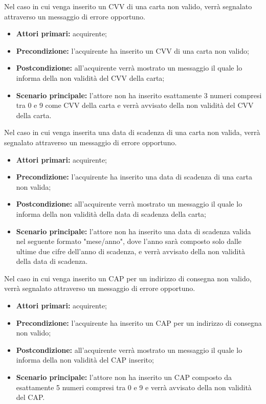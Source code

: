 Nel caso in cui venga inserito un CVV di una carta non valido, verrà segnalato attraverso un messaggio di errore opportuno.
\begin{itemize}
	\item \textbf{Attori primari:} acquirente;
	\item \textbf{Precondizione:} l'acquirente ha inserito un CVV di una carta non valido;
	\item \textbf{Postcondizione:} all'acquirente verrà mostrato un messaggio il quale lo informa della non validità del CVV della carta;
	\item \textbf{Scenario principale:} l'attore non ha inserito esattamente 3 numeri compresi tra 0 e 9 come CVV della carta e verrà avvisato della non validità del CVV della carta.
\end{itemize}

Nel caso in cui venga inserita una data di scadenza di una carta non valida, verrà segnalato attraverso un messaggio di errore opportuno.
\begin{itemize}
	\item \textbf{Attori primari:} acquirente;
	\item \textbf{Precondizione:} l'acquirente ha inserito una data di scadenza di una carta non valida;
	\item \textbf{Postcondizione:} all'acquirente verrà mostrato un messaggio il quale lo informa della non validità della data di scadenza della carta;
	\item \textbf{Scenario principale:} l'attore non ha inserito una data di scadenza valida nel seguente formato "mese/anno", dove l'anno sarà composto solo dalle ultime due cifre dell'anno di scadenza, e verrà avvisato della non validità della data di scadenza.
\end{itemize}

Nel caso in cui venga inserito un CAP per un indirizzo di consegna non valido, verrà segnalato attraverso un messaggio di errore opportuno.
\begin{itemize}
	\item \textbf{Attori primari:} acquirente;
	\item \textbf{Precondizione:} l'acquirente ha inserito un CAP per un indirizzo di consegna non valido;
	\item \textbf{Postcondizione:} all'acquirente verrà mostrato un messaggio il quale lo informa della non validità del CAP inserito;
	\item \textbf{Scenario principale:} l'attore non ha inserito un CAP composto da esattamente 5 numeri compresi tra 0 e 9 e verrà avvisato della non validità del CAP.
\end{itemize}

